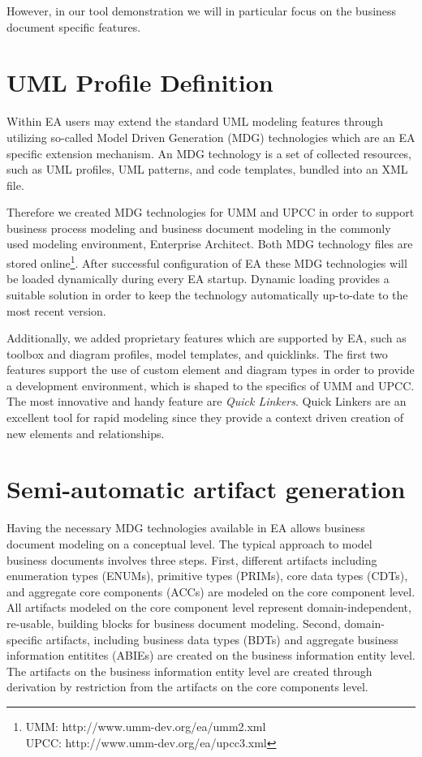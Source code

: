 \documentclass{acm_proc_article-sp}
\begin{document}
However, in our tool demonstration we will in particular focus on the business document specific features. 

\section{UML Profile Definition}
Within EA users may extend the standard UML modeling features through utilizing so-called Model Driven Generation (MDG) technologies which are an EA specific extension mechanism. An MDG technology is a set of collected resources, such as UML profiles, UML patterns, and code templates, bundled into an XML file.

Therefore we created MDG technologies for UMM and UPCC in order to support business process modeling and business document modeling in the commonly used modeling environment, Enterprise Architect. Both MDG technology files are stored online\footnote{UMM: http://www.umm-dev.org/ea/umm2.xml\\UPCC:\; http://www.umm-dev.org/ea/upcc3.xml}. After successful configuration of EA these MDG technologies will be loaded dynamically during every EA startup. Dynamic loading provides a suitable solution in order to keep the technology automatically up-to-date to the most recent version. 

Additionally, we added proprietary features which are supported by EA, such as toolbox and diagram profiles, model templates, and quicklinks. The first two features support the use of custom element and diagram types in order to provide a development environment, which is shaped to the specifics of UMM and UPCC. The most innovative and handy feature are \textit{Quick Linkers}. Quick Linkers are an excellent tool for rapid modeling since they provide a context driven creation of new elements and relationships. 

\section{Semi-automatic artifact generation}

Having the necessary MDG technologies available in EA allows business document modeling on a conceptual level. The typical approach to model business documents involves three steps. First, different artifacts including enumeration types (ENUMs), primitive types (PRIMs), core data types (CDTs), and aggregate core components (ACCs) are modeled on the core component level. All artifacts modeled on the core component level represent domain-independent, re-usable, building blocks for business document modeling. Second, domain-specific artifacts, including business data types (BDTs) and aggregate business information entitites (ABIEs) are created on the business information entity level. The artifacts on the business information entity level are created through derivation by restriction from the artifacts on the core components level. 
\end{document}
